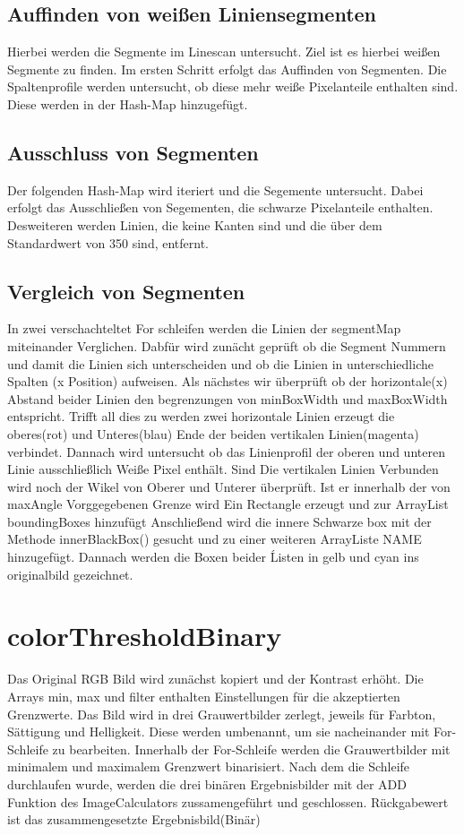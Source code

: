 \documentclass[a4paper,11pt,parskip]{article}
\begin{document}
\subsection{Auffinden von weißen Liniensegmenten}
Hierbei werden die Segmente im Linescan untersucht. Ziel ist es hierbei weißen Segmente zu finden. Im ersten Schritt erfolgt das Auffinden von Segmenten. Die Spaltenprofile werden untersucht, ob diese mehr weiße Pixelanteile enthalten sind. Diese werden in der Hash-Map hinzugefügt.\\

\subsection{Ausschluss von Segmenten}
Der folgenden Hash-Map wird iteriert und die Segemente untersucht. Dabei erfolgt das Ausschließen von Segementen, die schwarze Pixelanteile enthalten. Desweiteren werden Linien, die keine Kanten sind und die über dem Standardwert von 350 sind, entfernt. 

\subsection{Vergleich von Segmenten}
In zwei verschachteltet For schleifen werden die Linien der segmentMap miteinander Verglichen. 
Dabfür wird zunächt geprüft ob die Segment Nummern und damit die Linien sich unterscheiden und ob die Linien in unterschiedliche Spalten (x Position) aufweisen. 
Als nächstes wir überprüft ob der horizontale(x) Abstand beider Linien den begrenzungen von minBoxWidth und maxBoxWidth entspricht.
Trifft all dies zu werden zwei horizontale Linien erzeugt die oberes(rot) und Unteres(blau) Ende der beiden vertikalen Linien(magenta) verbindet. 
Dannach wird untersucht ob das Linienprofil der oberen  und unteren Linie ausschließlich Weiße Pixel enthält.
Sind Die vertikalen Linien Verbunden wird noch der Wikel von Oberer und Unterer überprüft.
Ist er innerhalb der von maxAngle Vorggegebenen Grenze wird Ein Rectangle erzeugt und zur ArrayList boundingBoxes hinzufügt
Anschließend wird die innere Schwarze box mit der Methode innerBlackBox() gesucht und zu einer weiteren ArrayListe NAME hinzugefügt. Dannach werden die Boxen beider Ĺisten in gelb und cyan ins originalbild gezeichnet.

\section{colorThresholdBinary}
Das Original RGB Bild wird zunächst kopiert und der Kontrast erhöht. Die Arrays min, max und filter enthalten Einstellungen für die akzeptierten Grenzwerte. Das Bild wird in drei Grauwertbilder zerlegt, jeweils für Farbton, Sättigung und Helligkeit. Diese werden umbenannt, um sie nacheinander mit For-Schleife zu bearbeiten. Innerhalb der For-Schleife werden die Grauwertbilder mit minimalem und maximalem Grenzwert binarisiert. Nach dem die Schleife durchlaufen wurde, werden die drei binären Ergebnisbilder mit der ADD Funktion des ImageCalculators zussamengeführt und geschlossen. Rückgabewert ist das zusammengesetzte Ergebnisbild(Binär)
\end{document}
